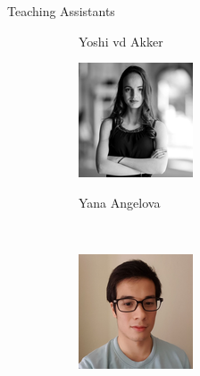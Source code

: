\begin{frame}
\begin{columns}[t]
\begin{exampleblock}{Teaching Assistants}
\begin{figure}[htpb]
\begin{subfigure}[]{0.4\textwidth}
			\caption*{Yoshi vd Akker}
			\end{subfigure}
			\hfill
			\begin{subfigure}[]{0.4\textwidth}
			\centering
			\includegraphics[width=\textwidth]{figures/yana.png}\\
			\caption*{Yana Angelova}
			\end{subfigure}
			\hfill\\
			\begin{subfigure}[]{0.4\textwidth}
			\centering
			\includegraphics[width=\textwidth]{figures/kevin.png}\\

\end{subfigure}
\end{figure}
\end{exampleblock}
\end{columns}
\end{frame}
